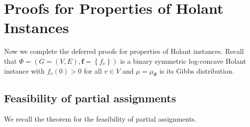 \documentclass[11pt]{article}
\newcommand{\set}[1]{\left\{#1\right\}}
\newcommand{\vecf}{\boldsymbol{f}}
\begin{document}










\appendix

\section{Proofs for Properties of Holant Instances} \label{sec:proof-Holant-properties}

Now we complete the deferred proofs for properties of Holant instances. Recall that $\Phi = (G = (V, E), \vecf = \set{f_v})$ is a binary symmetric log-concave Holant instance with $f_v(0) > 0$ for all $v \in V$ and $\mu = \mu_\Phi$ is its Gibbs distribution.

\subsection{Feasibility of partial assignments}

We recall the theorem for the feasibility of partial assignments.
\PartialFeasibility*
\end{document}
